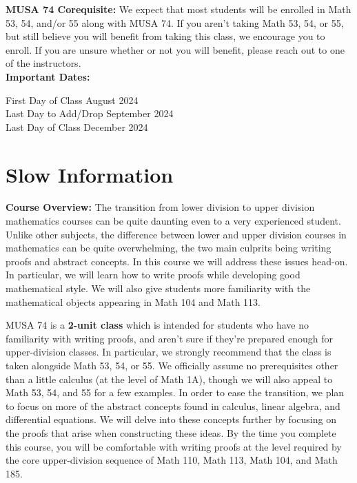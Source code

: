 \documentclass[11pt, a4paper]{article}
\begin{document}
\noindent\textbf{MUSA 74 Corequisite:} We expect that most students will be enrolled in Math 53, 54, and/or 55 along with MUSA 74. If you aren't taking Math 53, 54, or 55, but still believe you will benefit from taking this class, we encourage you to enroll. If you are unsure whether or not you will benefit, please reach out to one of the instructors. \\

\noindent\textbf{Important Dates:}
\begin{center} \begin{minipage}{3.8in}
\begin{flushleft}
First Day of Class      August 2024  \\
Last Day to Add/Drop      September 2024  \\
Last Day of Class       December 2024  \\
\end{flushleft}
\end{minipage}
\end{center}

\section*{Slow Information}
\noindent\textbf{Course Overview:} 
The transition from lower division to upper division mathematics courses can be quite daunting even to a very experienced student. Unlike other subjects, the difference between lower and upper division courses in mathematics can be quite overwhelming, the two main culprits being writing proofs and abstract concepts. In this course we will address these issues head-on. In particular, we will learn how to write proofs while developing good mathematical style. We will also give students more familiarity with the mathematical objects appearing in Math 104 and Math 113.

MUSA 74 is a \textbf{2-unit class} which is intended for students who have no familiarity with writing proofs, and aren’t sure if they’re prepared enough for upper-division classes. In particular, we strongly recommend that the class is taken alongside Math 53, 54, or 55. We officially assume no prerequisites other than a little calculus (at the level of Math 1A), though we will also appeal to Math 53, 54, and 55 for a few examples. In order to ease the transition, we plan to focus on more of the abstract concepts found in calculus, linear algebra, and differential equations. We will delve into these concepts further by focusing on the proofs that arise when constructing these ideas. By the time you complete this course, you will be comfortable with writing proofs at the level required by the core upper-division sequence of Math 110, Math 113, Math 104, and Math 185.
\end{document}
